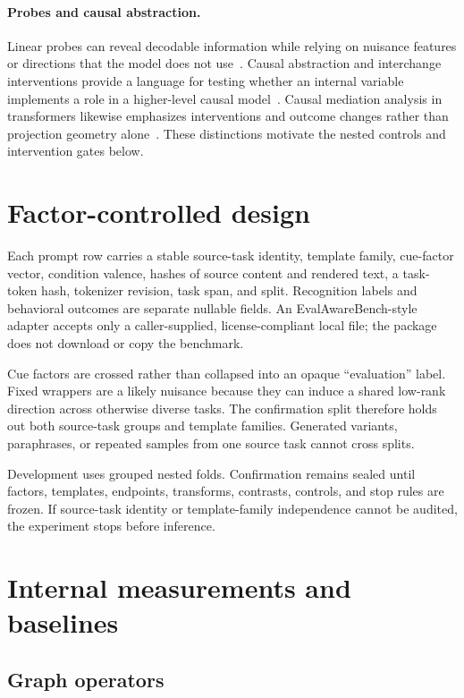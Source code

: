 \documentclass[10pt]{article}
\begin{document}
\paragraph{Probes and causal abstraction.}
Linear probes can reveal decodable information while relying on nuisance features or directions that the model does not use~\citep{belrose2023eliciting}. Causal abstraction and interchange interventions provide a language for testing whether an internal variable implements a role in a higher-level causal model~\citep{geiger2021causal}. Causal mediation analysis in transformers likewise emphasizes interventions and outcome changes rather than projection geometry alone~\citep{vig2020mediation}. These distinctions motivate the nested controls and intervention gates below.

\section{Factor-controlled design}

Each prompt row carries a stable source-task identity, template family, cue-factor vector, condition valence, hashes of source content and rendered text, a task-token hash, tokenizer revision, task span, and split. Recognition labels and behavioral outcomes are separate nullable fields. An EvalAwareBench-style adapter accepts only a caller-supplied, license-compliant local file; the package does not download or copy the benchmark.

Cue factors are crossed rather than collapsed into an opaque ``evaluation'' label. Fixed wrappers are a likely nuisance because they can induce a shared low-rank direction across otherwise diverse tasks. The confirmation split therefore holds out both source-task groups and template families. Generated variants, paraphrases, or repeated samples from one source task cannot cross splits.

Development uses grouped nested folds. Confirmation remains sealed until factors, templates, endpoints, transforms, contrasts, controls, and stop rules are frozen. If source-task identity or template-family independence cannot be audited, the experiment stops before inference.

\section{Internal measurements and baselines}

\subsection{Graph operators}
\end{document}
